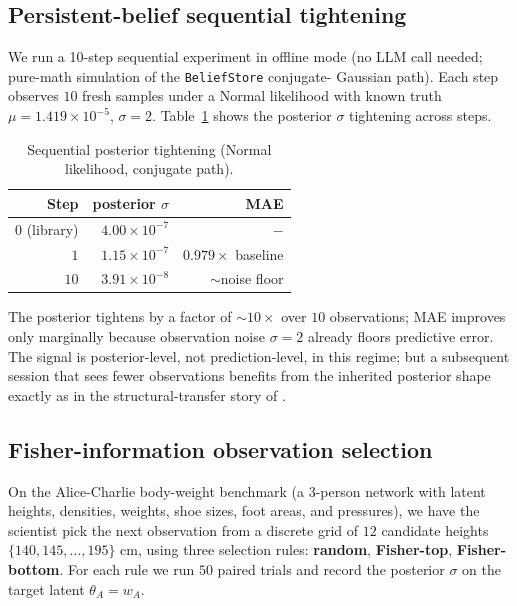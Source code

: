 \documentclass{article}
\begin{document}
\subsection{Persistent-belief sequential tightening}
\label{sec:exp-persistent}

We run a 10-step sequential experiment in offline mode (no LLM call
needed; pure-math simulation of the \texttt{BeliefStore} conjugate-
Gaussian path). Each step observes $10$ fresh samples under a
Normal likelihood with known truth $\mu = 1.419 \times 10^{-5}$,
$\sigma = 2$. Table~\ref{tab:persist} shows the posterior $\sigma$
tightening across steps.

\begin{table}[h]
\centering
\caption{Sequential posterior tightening (Normal likelihood, conjugate
path).}
\label{tab:persist}
\begin{tabular}{rrr}
\toprule
Step & posterior $\sigma$ & MAE \\
\midrule
$0$ (library)  & $4.00 \times 10^{-7}$ & $-$ \\
$1$            & $1.15 \times 10^{-7}$ & $0.979 \times$ baseline \\
$10$           & $3.91 \times 10^{-8}$ & $\sim$noise floor \\
\bottomrule
\end{tabular}
\end{table}

The posterior tightens by a factor of $\sim 10\times$ over
$10$ observations; MAE improves only marginally because observation
noise $\sigma = 2$ already floors predictive error. The signal is
posterior-level, not prediction-level, in this regime; but a
subsequent session that sees fewer observations benefits from the
inherited posterior shape exactly as in the structural-transfer
story of \citet{Anonymous2026MEISPaper3}.

\subsection{Fisher-information observation selection}
\label{sec:exp-fisher}

On the Alice-Charlie body-weight benchmark (a 3-person network with
latent heights, densities, weights, shoe sizes, foot areas, and
pressures), we have the scientist pick the next observation from a
discrete grid of $12$ candidate heights $\{140, 145, \ldots, 195\}$
cm, using three selection rules: \textbf{random}, \textbf{Fisher-top},
\textbf{Fisher-bottom}. For each rule we run $50$ paired trials and
record the posterior $\sigma$ on the target latent
$\theta_{A} = w_{A}$.
\end{document}
